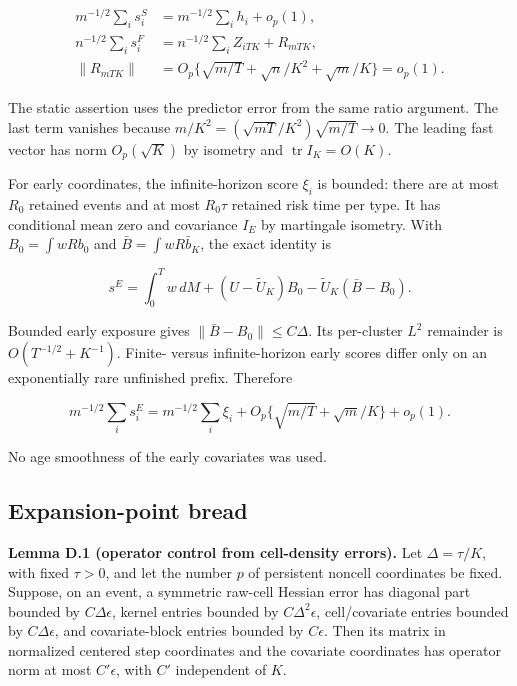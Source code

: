 \documentclass[11pt]{article}
\begin{document}
\begin{equation*}
\begin{aligned}
m^{-1/2}\sum_i s_i^S
 &=m^{-1/2}\sum_i h_i+o_p(1),\\
n^{-1/2}\sum_i s_i^F
 &=n^{-1/2}\sum_i Z_{iTK}+R_{mTK},\\
\|R_{mTK}\|
 &=O_p\{\sqrt{m/T}+\sqrt n/K^2+\sqrt m/K\}=o_p(1).
\end{aligned}\tag{D.3}\label{eq:D.3}
\end{equation*}

The static assertion uses the predictor error from the same ratio argument. The last term vanishes because
\(m/K^2=(\sqrt{mT}/K^2)\sqrt{m/T}\to0\).
The leading fast vector has norm \(O_p(\sqrt K)\) by isometry and
\(\operatorname{tr}I_K=O(K)\).

For early coordinates, the infinite-horizon score \(\xi_i\) is bounded: there are at most \(R_0\) retained events and at most \(R_0\tau\) retained risk time per type. It has conditional mean zero and covariance \(I_E\) by martingale isometry. With \(B_0=\int wRb_0\) and \(\bar B=\int wR\bar b_K\), the exact identity is

\begin{equation*}
s^E=\int_0^T w\,dM+(U-\widetilde U_K)B_0
                  -\widetilde U_K(\bar B-B_0).
\tag{D.4}\label{eq:D.4}
\end{equation*}

Bounded early exposure gives \(\|\bar B-B_0\|\leq C\Delta\). Its per-cluster \(L^2\) remainder is \(O(T^{-1/2}+K^{-1})\). Finite- versus infinite-horizon early scores differ only on an exponentially rare unfinished prefix. Therefore

\begin{equation*}
m^{-1/2}\sum_i s_i^E
=m^{-1/2}\sum_i\xi_i+
O_p\{\sqrt{m/T}+\sqrt m/K\}+o_p(1).
\tag{D.5}\label{eq:D.5}
\end{equation*}

No age smoothness of the early covariates was used.

\subsection{Expansion-point bread}\label{sec:D.2}

\label{res:Lemma-D.1}
\textbf{Lemma D.1 (operator control from cell-density errors).} Let \(\Delta=\tau/K\), with fixed \(\tau>0\), and let the number \(p\) of persistent noncell coordinates be fixed. Suppose, on an event, a symmetric raw-cell Hessian error has diagonal part bounded by \(C\Delta\epsilon\), kernel entries bounded by \(C\Delta^2\epsilon\), cell/covariate entries bounded by \(C\Delta\epsilon\), and covariate-block entries bounded by \(C\epsilon\). Then its matrix in normalized centered step coordinates and the covariate coordinates has operator norm at most \(C'\epsilon\), with \(C'\) independent of \(K\).
\end{document}

